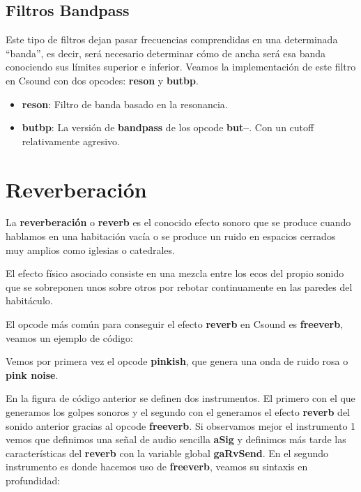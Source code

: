 \subsection{Filtros Bandpass}
Este tipo de filtros dejan pasar frecuencias comprendidas en una determinada ``banda'', es decir, será necesario determinar cómo de ancha será esa banda conociendo sus límites superior e inferior. Veamos la implementación de este filtro en Csound con dos opcodes: \textbf{reson} y \textbf{butbp}.
\begin{itemize}
 \item \textbf{reson}: Filtro de banda basado en la resonancia.
 \item \textbf{butbp}: La versión de \textbf{bandpass} de los opcode \textbf{but--}. Con un cutoff relativamente agresivo. 
\end{itemize}

\section{Reverberación}
La \textbf{reverberación} o \textbf{reverb} es el conocido efecto sonoro que se produce cuando hablamos en una habitación vacía o se produce un ruido en espacios cerrados muy amplios como iglesias o catedrales. 

El efecto físico asociado consiste en una mezcla entre los ecos del propio sonido que se sobreponen unos sobre otros por rebotar continuamente en las paredes del habitáculo.

El opcode más común para conseguir el efecto \textbf{reverb} en Csound es \textbf{freeverb}, veamos un ejemplo de código:


Vemos por primera vez el opcode \textbf{pinkish}, que genera una onda de ruido rosa o \textbf{pink noise}.
 
En la figura de código anterior se definen dos instrumentos. El primero con el que generamos los golpes sonoros y el segundo con el generamos el efecto \textbf{reverb} del sonido anterior gracias al opcode \textbf{freeverb}. Si observamos mejor el instrumento 1 vemos que definimos una señal de audio sencilla \textbf{aSig} y definimos más tarde las características del \textbf{reverb} con la variable global \textbf{gaRvSend}. En el segundo instrumento es donde hacemos uso de \textbf{freeverb}, veamos su sintaxis en profundidad: 

